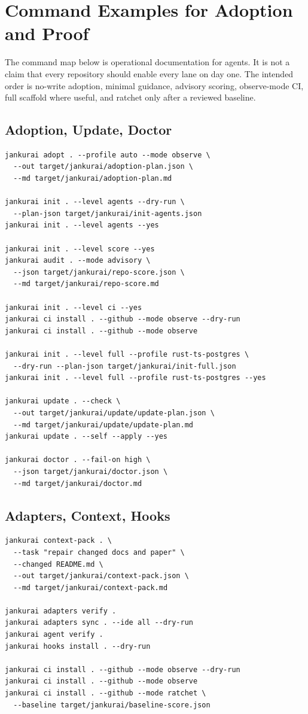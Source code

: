 \section{Command Examples for Adoption and Proof}

The command map below is operational documentation for agents. It is not a claim that every repository should enable every lane on day one. The intended order is no-write adoption, minimal guidance, advisory scoring, observe-mode CI, full scaffold where useful, and ratchet only after a reviewed baseline.

\subsection{Adoption, Update, Doctor}

\begin{lstlisting}[style=codebox]
jankurai adopt . --profile auto --mode observe \
  --out target/jankurai/adoption-plan.json \
  --md target/jankurai/adoption-plan.md

jankurai init . --level agents --dry-run \
  --plan-json target/jankurai/init-agents.json
jankurai init . --level agents --yes

jankurai init . --level score --yes
jankurai audit . --mode advisory \
  --json target/jankurai/repo-score.json \
  --md target/jankurai/repo-score.md

jankurai init . --level ci --yes
jankurai ci install . --github --mode observe --dry-run
jankurai ci install . --github --mode observe

jankurai init . --level full --profile rust-ts-postgres \
  --dry-run --plan-json target/jankurai/init-full.json
jankurai init . --level full --profile rust-ts-postgres --yes

jankurai update . --check \
  --out target/jankurai/update/update-plan.json \
  --md target/jankurai/update/update-plan.md
jankurai update . --self --apply --yes

jankurai doctor . --fail-on high \
  --json target/jankurai/doctor.json \
  --md target/jankurai/doctor.md
\end{lstlisting}

\subsection{Adapters, Context, Hooks}

\begin{lstlisting}[style=codebox]
jankurai context-pack . \
  --task "repair changed docs and paper" \
  --changed README.md \
  --out target/jankurai/context-pack.json \
  --md target/jankurai/context-pack.md

jankurai adapters verify .
jankurai adapters sync . --ide all --dry-run
jankurai agent verify .
jankurai hooks install . --dry-run

jankurai ci install . --github --mode observe --dry-run
jankurai ci install . --github --mode observe
jankurai ci install . --github --mode ratchet \
  --baseline target/jankurai/baseline-score.json
\end{lstlisting}

